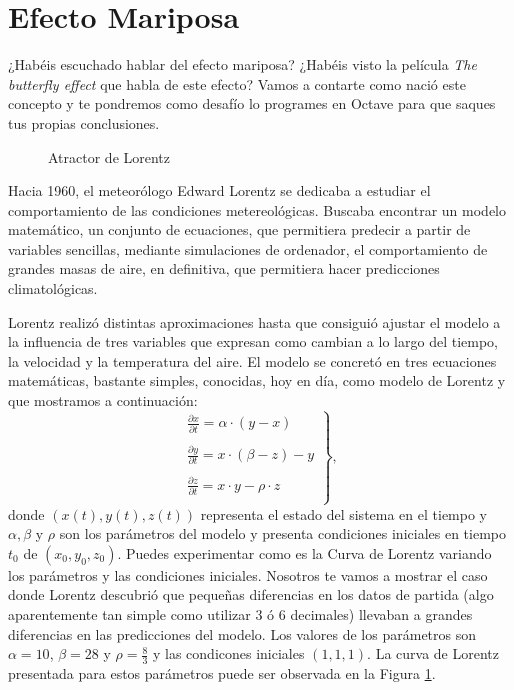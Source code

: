 \section{Efecto Mariposa}
¿Habéis escuchado hablar del efecto mariposa? ¿Habéis visto la
película \emph{The butterfly effect} que habla de este efecto? Vamos a
contarte como nació este concepto y te pondremos como desafío lo
programes en Octave para que saques tus propias conclusiones.

\begin{figure}[ht!]
\centering \scalebox{0.5}{}
\caption{Atractor de Lorentz}
\label{Lorentz}
\end{figure}

Hacia 1960, el meteorólogo Edward Lorentz se dedicaba a estudiar el comportamiento de las condiciones 
metereológicas. Buscaba encontrar un modelo matemático, un conjunto de ecuaciones, que
permitiera predecir a partir de variables sencillas, mediante simulaciones de ordenador, el
comportamiento de grandes masas de aire, en definitiva, que permitiera hacer predicciones
climatológicas.

Lorentz realizó distintas aproximaciones hasta que consiguió ajustar el modelo a la influencia de tres
variables que expresan como cambian a lo largo del tiempo, la velocidad y la temperatura del aire.
El modelo se concretó en tres ecuaciones matemáticas, bastante simples, conocidas, hoy en día,
como modelo de Lorentz y que mostramos a continuación:
\begin{equation}\left.
\begin{array}{l}
\frac{\partial x}{\partial t}=\alpha \cdot (y-x)\\
\\
\frac{\partial y}{\partial t}=x\cdot(\beta-z)-y\\
\\
\frac{\partial z}{\partial t}=x\cdot y-\rho\cdot z\\
\end{array}\right\},
\end{equation}
donde $(x(t),y(t),z(t))$ representa el estado del sistema en el tiempo y $\alpha, \beta$ y $\rho$ son los parámetros del modelo y presenta condiciones iniciales en tiempo $t_0$ de $(x_0,y_0,z_0)$.
Puedes experimentar como es la Curva de Lorentz variando los parámetros y las condiciones iniciales. Nosotros te vamos a mostrar el caso donde Lorentz descubrió
que pequeñas diferencias en los datos de
partida (algo aparentemente tan simple como utilizar 3 ó 6 decimales) llevaban a grandes diferencias
en las predicciones del modelo. Los valores de los parámetros son $\alpha=10$, $\beta=28$ y $\rho=\frac{8}{3}$ y las condicones iniciales $(1,1,1)$.
La curva de Lorentz presentada para estos parámetros puede ser observada en la Figura \ref{Lorentz}.

